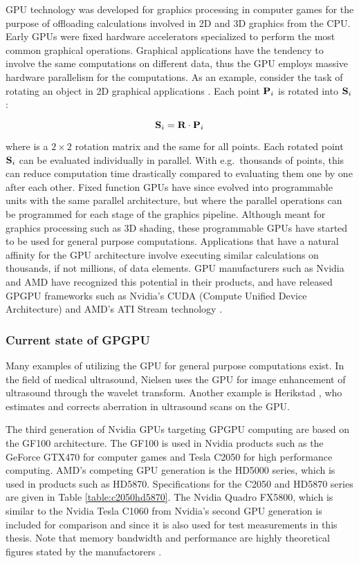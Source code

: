 GPU technology was developed for graphics processing in computer games for the purpose of offloading calculations involved in 2D and 3D graphics from the CPU. Early GPUs were fixed hardware accelerators specialized to perform the most common graphical operations. Graphical applications have the tendency to involve the same computations on different data, thus the GPU employs massive hardware parallelism for the computations. As an example, consider the task of rotating an object in 2D graphical applications \cite{hearn2004}. Each point $\textbf{P}_i$ is rotated into $\textbf{S}_i$:

	\begin{equation}
		\textbf{S}_i = \textbf{R} \cdot \textbf{P}_i
		\label{eq:rotation_transform}
	\end{equation}
	
	where  is a $2 \times 2$ rotation matrix and the same for all points. Each rotated point $\textbf{S}_i$ can be evaluated individually in parallel. With e.g.\ thousands of points, this can reduce computation time drastically compared to evaluating them one by one after each other. Fixed function GPUs have since evolved into programmable units with the same parallel architecture, but where the parallel operations can be programmed for each stage of the graphics pipeline. Although meant for graphics processing such as 3D shading, these programmable GPUs have started to be used for general purpose computations. Applications that have a natural affinity for the GPU architecture involve executing similar calculations on thousands, if not millions, of data elements. GPU manufacturers such as Nvidia and AMD have recognized this potential in their products, and have released GPGPU frameworks such as Nvidia's CUDA (Compute Unified Device Architecture) \cite{kirk2010, cudaprogguide} and AMD's ATI Stream technology \cite{streamreleasenotes}.
	
\subsubsection{Current state of GPGPU}

	 Many examples of utilizing the GPU for general purpose computations exist. In the field of medical ultrasound, Nielsen \cite{nielsen2007} uses the GPU for image enhancement of ultrasound through the wavelet transform. Another example is Herikstad \cite{herikstad2009}, who estimates and corrects aberration in ultrasound scans on the GPU.

	The third generation of Nvidia GPUs targeting GPGPU computing are based on the GF100 architecture. The GF100 is used in Nvidia products such as the GeForce GTX470 for computer games and Tesla C2050 for high performance computing. AMD's competing GPU generation is the HD5000 series, which is used in products such as HD5870. Specifications for the C2050 and HD5870 series are given in Table \ref{table:c2050hd5870}. The Nvidia Quadro FX5800, which is similar to the Nvidia Tesla C1060 from Nvidia's second GPU generation is included for comparison and since it is also used for test measurements in this thesis. Note that memory bandwidth and performance are highly theoretical figures stated by the manufactorers \cite{c2050, fx5800, hd5870}.
	
